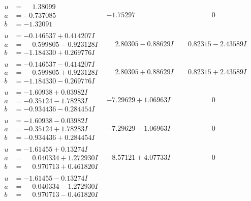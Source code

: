 \documentclass[1p]{elsarticle_modified}
\theoremstyle{definition}
\begin{document}
$$\begin{array}{c|c|c}
\begin{aligned}
u &= \phantom{-}1.38099\phantom{ +0.000000I} \\
a &= -0.737085\phantom{ +0.000000I} \\
b &= -1.32091\phantom{ +0.000000I}\end{aligned}
 & -1.75297\phantom{ +0.000000I} & \phantom{-0.000000 } 0 \\ \hline\begin{aligned}
u &= -0.146537 + 0.414207 I \\
a &= \phantom{-}0.599805 - 0.923128 I \\
b &= -1.184330 + 0.269776 I\end{aligned}
 & \phantom{-}2.80305 - 0.88629 I & \phantom{-}0.82315 - 2.43589 I \\ \hline\begin{aligned}
u &= -0.146537 - 0.414207 I \\
a &= \phantom{-}0.599805 + 0.923128 I \\
b &= -1.184330 - 0.269776 I\end{aligned}
 & \phantom{-}2.80305 + 0.88629 I & \phantom{-}0.82315 + 2.43589 I \\ \hline\begin{aligned}
u &= -1.60938 + 0.03982 I \\
a &= -0.35124 - 1.78283 I \\
b &= -0.934436 - 0.284454 I\end{aligned}
 & -7.29629 + 1.06963 I & \phantom{-0.000000 } 0 \\ \hline\begin{aligned}
u &= -1.60938 - 0.03982 I \\
a &= -0.35124 + 1.78283 I \\
b &= -0.934436 + 0.284454 I\end{aligned}
 & -7.29629 - 1.06963 I & \phantom{-0.000000 } 0 \\ \hline\begin{aligned}
u &= -1.61455 + 0.13274 I \\
a &= \phantom{-}0.040334 + 1.272930 I \\
b &= \phantom{-}0.970713 + 0.461820 I\end{aligned}
 & -8.57121 + 4.07733 I & \phantom{-0.000000 } 0 \\ \hline\begin{aligned}
u &= -1.61455 - 0.13274 I \\
a &= \phantom{-}0.040334 - 1.272930 I \\
b &= \phantom{-}0.970713 - 0.461820 I\end{aligned}

\end{array}$$
\end{document}
